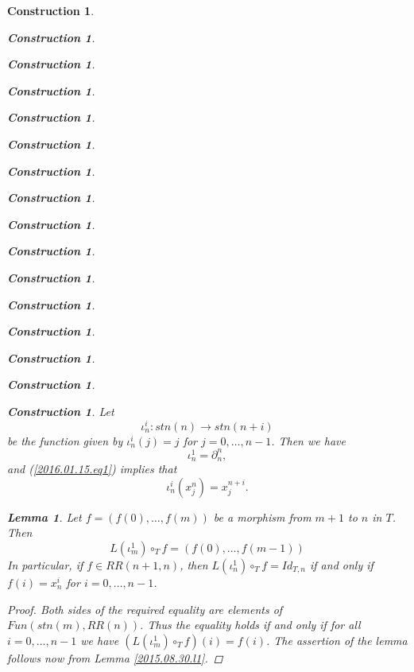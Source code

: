 \documentclass[12pt]{amsart}
\newtheorem{lemma}[proposition]{Lemma}
\numberwithin{proposition}{subsection}
\newtheorem{construction}[proposition]{Construction}
\newcommand{\llabel}[1]{\label{#1}}
\newcommand{\sr}{\rightarrow}
\newcommand{\hc}{\circ_{T}}
\begin{document}
\begin{construction}
\begin{construction}
\begin{construction}
\begin{construction}
\begin{construction}
\begin{construction}
\begin{construction}
\begin{construction}
\begin{construction}
\begin{construction}
\begin{construction}
\begin{construction}
\begin{construction}
\begin{construction}
\begin{construction}
\begin{construction}
Let 
%
$${\iota}_n^{i}:stn(n)\sr stn(n+i)$$
%
be the function given by ${\iota}_n^i(j)=j$ for $j=0,\dots,n-1$. Then we have
%
\begin{equation}
\llabel{2015.08.22.eq7}
{\iota}_n^{1}=\partial_{n}^{n},
\end{equation}%
%
and (\ref{2016.01.15.eq1}) implies that 
%
\begin{equation}
\llabel{2015.08.22.eq8}
{\iota}_n^i(x^n_j)=x^{n+i}_j.
\end{equation}%
%
\begin{lemma}
\llabel{2015.08.26.l1}
Let $f=(f(0),\dots,f(m))$ be a morphism from $m+1$ to $n$ in $T$. Then
%
\begin{equation}\llabel{2016.01.15.eq3}
L(\iota_m^1)\hc f=(f(0),\dots,f(m-1))
\end{equation}%
%
In particular, if $f\in RR(n+1,n)$, then $L(\iota_n^1)\hc f=Id_{T,n}$ if and only if $f(i)=x_n^i$ for $i=0,\dots,n-1$. 
\end{lemma}
%
\begin{proof}
Both sides of the required equality are elements of
$Fun(stn(m),RR(n))$. Thus the equality holds if and only if for all
$i=0,\dots,n-1$ we have $(L(\iota_m^1)\hc f)(i)=f(i)$. The assertion of the
lemma follows now from Lemma \ref{2015.08.30.l1}.


\end{proof}
\end{construction}
\end{construction}
\end{construction}
\end{construction}
\end{construction}
\end{construction}
\end{construction}
\end{construction}
\end{construction}
\end{construction}
\end{construction}
\end{construction}
\end{construction}
\end{construction}
\end{construction}
\end{construction}
\end{document}
